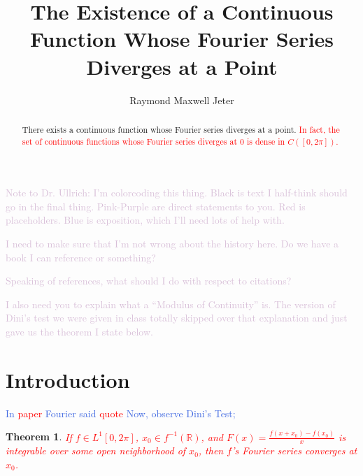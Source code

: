\documentclass{amsart}
\newcommand{\R}{\mathbb{R}}
\newcommand{\colorcomment}[2]{\textcolor{#1}{#2}} %
\newtheorem{thm}{Theorem}[section]
\theoremstyle{definition}
\begin{document}
\title{The Existence of a Continuous Function Whose Fourier Series Diverges at a Point}
\author{Raymond Maxwell Jeter}

\begin{abstract}
There exists a continuous function whose Fourier series diverges at a point. 
\colorcomment{red}{In fact, the set of continuous functions whose Fourier series diverges at $0$ is dense in $C([0,2 \pi])$.}
\end{abstract}

\maketitle

\colorcomment{Thistle}{Note to Dr. Ullrich: I'm colorcoding this thing. Black is text I half-think should go in the final thing. Pink-Purple are direct statements to you. Red is placeholders. Blue is exposition, which I'll need lots of help with.}

\colorcomment{Thistle}{I need to make sure that I'm not wrong about the history here. Do we have a book I can reference or something?}

\colorcomment{Thistle}{Speaking of references, what should I do with respect to citations?}

\colorcomment{Thistle}{I also need you to explain what a ``Modulus of Continuity'' is. The version of Dini's test we were given in class totally skipped over that explanation and just gave us the theorem I state below.}

\section{Introduction}


\colorcomment{RoyalBlue}{In \colorcomment{red}{paper} Fourier said \colorcomment{red}{quote} 
Now, observe Dini's Test;}

\begin{thm}
\colorcomment{red}{If $f \in L^1[0, 2\pi]$, $x_0 \in f^{-1}(\R)$, and $F(x) = \frac{f(x+x_0) - f(x_0)}{x}$ is integrable over some open neighborhood of $x_0$, then $f$'s Fourier series converges at $x_0$.}
\end{thm}
\end{document}
